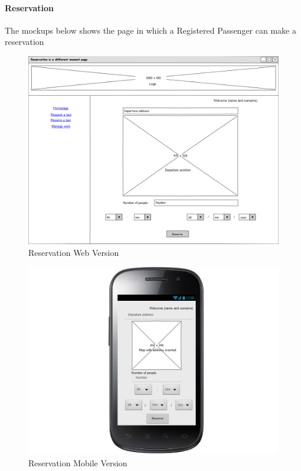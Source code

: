 \documentclass[a4paper,12pt,dvipsnames]{article}%
\begin{document}
\paragraph{Reservation}
The mockups below shows the page in which a Registered Passenger can make a reservation
\begin{figure}[H]
\centering
\includegraphics[scale=0.35]{mockups/reservation_web.png}
\caption{Reservation Web Version}
\end{figure}
\begin{figure}[H]
\centering
\includegraphics[scale=0.35]{mockups/reservation_mobile.png}
\caption{Reservation Mobile Version}
\end{figure}
\break
\end{document}
